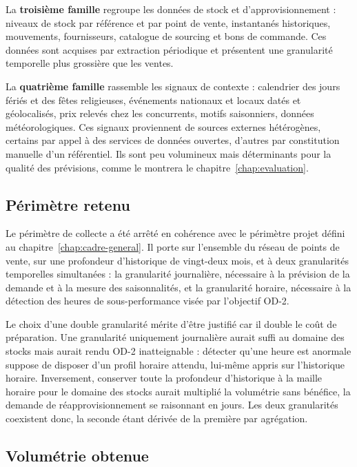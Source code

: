 La \textbf{troisième famille} regroupe les données de stock et d'approvisionnement : niveaux de stock par référence et par point de vente, instantanés historiques, mouvements, fournisseurs, catalogue de sourcing et bons de commande. Ces données sont acquises par extraction périodique et présentent une granularité temporelle plus grossière que les ventes.

La \textbf{quatrième famille} rassemble les signaux de contexte : calendrier des jours fériés et des fêtes religieuses, événements nationaux et locaux datés et géolocalisés, prix relevés chez les concurrents, motifs saisonniers, données météorologiques. Ces signaux proviennent de sources externes hétérogènes, certains par appel à des services de données ouvertes, d'autres par constitution manuelle d'un référentiel. Ils sont peu volumineux mais déterminants pour la qualité des prévisions, comme le montrera le chapitre~\ref{chap:evaluation}.

\subsection{Périmètre retenu}

Le périmètre de collecte a été arrêté en cohérence avec le périmètre projet défini au chapitre~\ref{chap:cadre-general}. Il porte sur l'ensemble du réseau de points de vente, sur une profondeur d'historique de vingt-deux mois, et à deux granularités temporelles simultanées : la granularité journalière, nécessaire à la prévision de la demande et à la mesure des saisonnalités, et la granularité horaire, nécessaire à la détection des heures de sous-performance visée par l'objectif OD-2.

Le choix d'une double granularité mérite d'être justifié car il double le coût de préparation. Une granularité uniquement journalière aurait suffi au domaine des stocks mais aurait rendu OD-2 inatteignable : détecter qu'une heure est anormale suppose de disposer d'un profil horaire attendu, lui-même appris sur l'historique horaire. Inversement, conserver toute la profondeur d'historique à la maille horaire pour le domaine des stocks aurait multiplié la volumétrie sans bénéfice, la demande de réapprovisionnement se raisonnant en jours. Les deux granularités coexistent donc, la seconde étant dérivée de la première par agrégation.

\subsection{Volumétrie obtenue}


